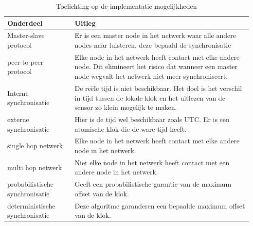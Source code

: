 \documentclass{article}
\begin{document}
\label{Terminologie}
\begin{table}[H]
	\centering
	\caption{Toelichting op de implementatie mogelijkheden}
	\label{tab: implmentatie_mogelijkheden}
    \begin{tabular}{ | l | p{5cm} |}\hline
    
    \textbf{Onderdeel} & \textbf{Uitleg} \\ \hline\hline
    Master-slave protocol & Er is een master node in het netwerk waar alle andere nodes naar luisteren, deze bepaald de synchronisatie \\ \hline
    peer-to-peer protocol &  Elke node in het netwerk heeft contact met elke andere node. Dit elimineert het risico dat wanneer een master node wegvalt het netwerk niet meer synchroniseert.\\ \hline
    Interne synchronisatie & De re\"{e}le tijd is niet beschikbaar. Het doel is het verschil in tijd tussen de lokale klok en het uitlezen van de sensor zo klein mogelijk te maken.\\
    \hline
    externe synchronisatie & Hier is de tijd wel beschikbaar zoals UTC. Er is een atomische klok die de ware tijd heeft.\\
    \hline
    single hop netwerk & Elke node in het netwerk heeft contact met elke andere node in het netwerk\\
    \hline
    multi hop netwerk & Niet elke node in het netwerk heeft contact met een andere node in het netwerk. \\
    \hline
    probabilistische synchronisatie & Geeft een probabilistische garantie van de maximum offset van de klok. \\
    \hline
    deterministische synchronisatie & Deze algoritme garanderen een bepaalde maximum offset van de klok. \\
    \hline
    \end{tabular}
\end{table}
\end{document}
